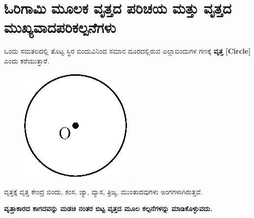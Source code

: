  
\section{ಓರಿಗಾಮಿ ಮೂಲಕ ವೃತ್ತದ ಪರಿಚಯ ಮತ್ತು ವೃತ್ತದ ಮುಖ್ಯವಾದ\break ಪರಿಕಲ್ಪನೆಗಳು}\label{sec1.12}%
 

ಒಂದು ಸಮತಲದಲ್ಲಿ ತೊಟ್ಟ ಸ್ಥಿರ ಬಿಂದುವಿನಿಂದ ಸಮಾನ ದೂರದಲ್ಲಿರುವ ಎಲ್ಲಾ\break  ಬಿಂದುಗಳ ಗಣಕ್ಕೆ \textbf{ವೃತ್ತ [Circle]} ಎಂದು ಕರೆಯುತ್ತಾರೆ. 
\begin{figure}[H]
\centering
\includegraphics[scale=.9]{src/figure/chap1/fig1-23.eps}
\end{figure}
 
ವೃತ್ತಕ್ಕೆ ವೃತ್ತ ಕೇಂದ್ರ ಬಿಂದು, ಕಂಸ, ಜ್ಯಾ, ವ್ಯಾಸ, ತ್ರಿಜ್ಯ, ಮುಂತಾದವುಗಳು ಅಂಗಗಳಾಗಿರುತ್ತವೆ. 
 

\noindent
\textbf{ವೃತ್ತಾಕಾರದ ಕಾಗದವನ್ನು ಮಡಚಿ ನಂತರ ಬಿಟ್ಟ ವೃತ್ತದ ಮೂಲ ಕಲ್ಪನೆಗಳನ್ನು ಮಾಡಿಕೊಳ್ಳುವದು.}

